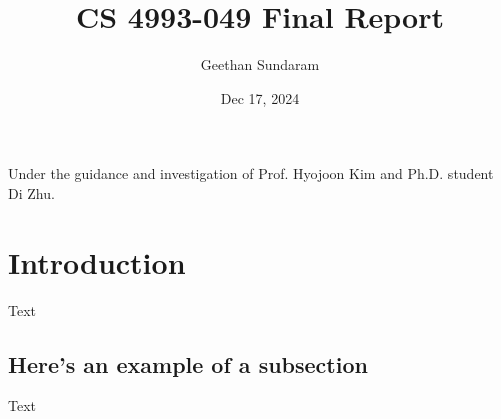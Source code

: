 \documentclass[11pt]{article}
\title{
  CS 4993-049
  Final Report 
}
\author{
  Geethan Sundaram
}
\date{
  Dec 17, 2024
}
\begin{document}
\maketitle


Under the guidance and investigation of Prof. Hyojoon Kim and Ph.D. student Di Zhu.

\section{Introduction}

Text

\subsection{Here's an example of a subsection}

Text
\end{document}
